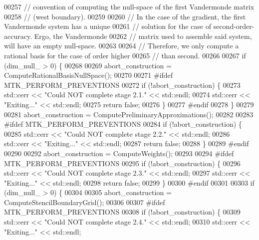 \begin{DoxyCode}
{{00257   \textcolor{comment}{// convention of computing the null-space of the first Vandermonde matrix}
00258   \textcolor{comment}{// (west boundary).}
00259 
00260   \textcolor{comment}{// In the case of the gradient, the first Vandermonde system has a unique}
00261   \textcolor{comment}{// solution for the case of second-order-accuracy. Ergo, the Vandermonde}
00262   \textcolor{comment}{// matrix used to assemble said system, will have an empty null-space.}
00263 
00264   \textcolor{comment}{// Therefore, we only compute a rational basis for the case of order higher}
00265   \textcolor{comment}{// than second.}
00266 
00267   \textcolor{keywordflow}{if} (dim\_null\_ > 0) \{
00268 
00269     abort\_construction = ComputeRationalBasisNullSpace();
00270 
00271 \textcolor{preprocessor}{    #ifdef MTK\_PERFORM\_PREVENTIONS}
00272     \textcolor{keywordflow}{if} (!abort\_construction) \{
00273       std::cerr << \textcolor{stringliteral}{"Could NOT complete stage 2.1."} << std::endl;
00274       std::cerr << \textcolor{stringliteral}{"Exiting..."} << std::endl;
00275       \textcolor{keywordflow}{return} \textcolor{keyword}{false};
00276     \}
00277 \textcolor{preprocessor}{    #endif}
00278   \}
00279 
00281   abort\_construction = ComputePreliminaryApproximations();
00282 
00283 \textcolor{preprocessor}{  #ifdef MTK\_PERFORM\_PREVENTIONS}
00284   \textcolor{keywordflow}{if} (!abort\_construction) \{
00285     std::cerr << \textcolor{stringliteral}{"Could NOT complete stage 2.2."} << std::endl;
00286     std::cerr << \textcolor{stringliteral}{"Exiting..."} << std::endl;
00287     \textcolor{keywordflow}{return} \textcolor{keyword}{false};
00288   \}
00289 \textcolor{preprocessor}{  #endif}
00290 
00292   abort\_construction = ComputeWeights();
00293 
00294 \textcolor{preprocessor}{  #ifdef MTK\_PERFORM\_PREVENTIONS}
00295   \textcolor{keywordflow}{if} (!abort\_construction) \{
00296     std::cerr << \textcolor{stringliteral}{"Could NOT complete stage 2.3."} << std::endl;
00297     std::cerr << \textcolor{stringliteral}{"Exiting..."} << std::endl;
00298     \textcolor{keywordflow}{return} \textcolor{keyword}{false};
00299   \}
00300 \textcolor{preprocessor}{  #endif}
00301 
00303   \textcolor{keywordflow}{if} (dim\_null\_ > 0) \{
00304 
00305     abort\_construction = ComputeStencilBoundaryGrid();
00306 
00307 \textcolor{preprocessor}{    #ifdef MTK\_PERFORM\_PREVENTIONS}
00308     \textcolor{keywordflow}{if} (!abort\_construction) \{
00309       std::cerr << \textcolor{stringliteral}{"Could NOT complete stage 2.4."} << std::endl;
00310       std::cerr << \textcolor{stringliteral}{"Exiting..."} << std::endl;
}}
\end{DoxyCode}
